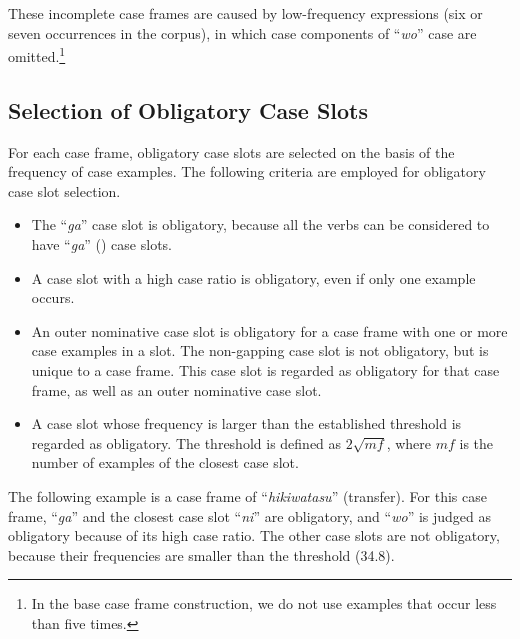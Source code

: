 \documentclass[english]{jnlp_1.4_rep}
\newcommand{\nom}{}
\begin{document}
These incomplete case frames are caused by low-frequency expressions (six
or seven occurrences in the corpus), in which case components of ``\textit{wo}'' case are
omitted.\footnote{In the base case frame construction, we do not use
examples that occur less than five times.}


\subsection{Selection of Obligatory Case Slots}

For each case frame, obligatory case slots are selected on the basis of
\pagebreak
the frequency of case examples. The following criteria are employed for
obligatory case slot selection.
\begin{itemize}
 \item The ``\textit{ga}'' case slot is obligatory, because all the verbs
       can be considered to have ``\textit{ga}'' (\nom) case slots.
 \item A case slot with a high case ratio is obligatory, even if only
       one example occurs.
 \item An outer nominative case slot is obligatory for a case frame with
       one or more case examples in a slot. The non-gapping case slot
       is not obligatory, but is unique to a case frame. This case slot
       is regarded as obligatory for that case frame, as well as an outer nominative case slot.
 \item A case slot whose frequency is larger than the established threshold is
       regarded as \linebreak obligatory. The threshold is defined as $2\sqrt{mf}$,
       where $mf$ is the number of examples of the closest case slot.
\end{itemize}

The following example is a case frame of ``\textit{hikiwatasu}''
(transfer). For this case frame, ``\textit{ga}'' and the closest case
slot ``\textit{ni}'' are obligatory, and ``\textit{wo}'' is judged as
obligatory because of its high case ratio. The other case slots are not
obligatory, because their frequencies are smaller than the threshold (34.8).
\end{document}
